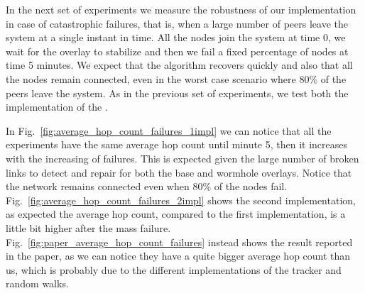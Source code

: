 \newpage
In the next set of experiments we measure the robustness of our implementation in case of catastrophic failures, that is, when a large number of peers leave the system at a single instant in time. All the nodes join the system at time 0, we wait for the overlay to stabilize and then we fail a fixed percentage of nodes at time 5 minutes. We expect that the algorithm recovers quickly and also that all the nodes remain connected, even in the worst case scenario where 80\% of the peers leave the system. As in the previous set of experiments, we test both the implementation of the \getMetropolisHastingsNeighbour.

In Fig.~\ref{fig:average_hop_count_failures_1impl} we can notice that all the experiments have the same average hop count until minute 5, then it increases with the increasing of failures. This is expected given the large number of broken links to detect and repair for both the base and wormhole overlays. Notice that the network remains connected even when 80\% of the nodes fail. Fig.~\ref{fig:average_hop_count_failures_2impl} shows the second implementation, as expected the average hop count, compared to the first implementation, is a little bit higher after the mass failure. Fig.~\ref{fig:paper_average_hop_count_failures} instead shows the result reported in the paper, as we can notice they have a quite bigger average hop count than us, which is probably due to the different implementations of the tracker and random walks.

